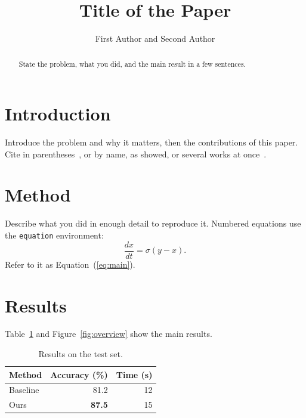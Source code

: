 \documentclass{nrc2}
\begin{document}
\title{Title of the Paper}

\author{First Author and Second Author}

\address{F. Author. Department of Earth Sciences, University, City, Country.\\
S. Author. Institute, City, Country.}


\begin{abstract}
State the problem, what you did, and the main result in a few sentences.
\end{abstract}


\maketitle

\section{Introduction}
\label{sec:intro}
Introduce the problem and why it matters, then the contributions of this
paper. Cite in parentheses~\citep{lorenz1963}, or by name, as \citet{manabe1967} showed, or several works at
once~\citep{lorenz1963,manabe1967}.

\section{Method}
\label{sec:method}
Describe what you did in enough detail to reproduce it. Numbered equations use
the \texttt{equation} environment:
\begin{equation}
  \label{eq:main}
  \frac{dx}{dt} = \sigma (y - x).
\end{equation}
Refer to it as Equation~(\ref{eq:main}).

\section{Results}
\label{sec:results}
Table~\ref{tab:results} and Figure~\ref{fig:overview} show the main results.

\begin{table}[htbp]
  \centering
  \caption{Results on the test set.}
  \label{tab:results}
  \begin{tabular}{lrr}
    \toprule
    Method & Accuracy (\%) & Time (s) \\
    \midrule
    Baseline & 81.2 & 12 \\
    Ours & \textbf{87.5} & 15 \\
    \bottomrule
  \end{tabular}
\end{table}
\end{document}
